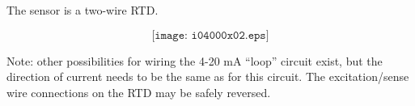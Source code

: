 \vskip 10pt

The sensor is a two-wire RTD.







$$\texttt{[image: i04000x02.eps]}$$

Note: other possibilities for wiring the 4-20 mA ``loop'' circuit exist, but the direction of current needs to be the same as for this circuit.  The excitation/sense wire connections on the RTD may be safely reversed. 




